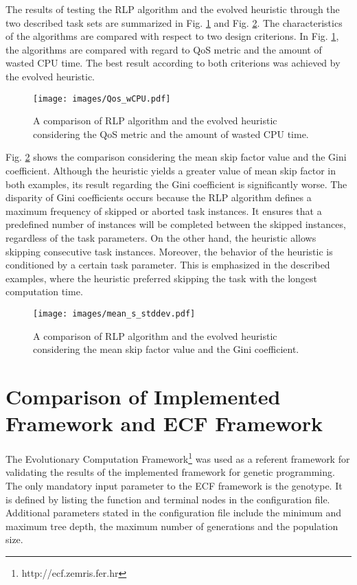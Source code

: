 The results of testing the RLP algorithm and the evolved heuristic through the two described task sets are summarized in Fig. \ref{cmp1} and Fig. \ref{cmp2}.
The characteristics of the algorithms are compared with respect to two design criterions. 
In Fig. \ref{cmp1}, the algorithms are compared with regard to QoS metric and the amount of wasted CPU time. The best result according to both criterions was achieved by the evolved heuristic. 
\begin{figure}[H]
    \centering
    \texttt{[image: images/Qos\_wCPU.pdf]}
    \caption{A comparison of RLP algorithm and the evolved heuristic considering the QoS metric and the amount of wasted CPU time.}
    \label{cmp1}
\end{figure}

Fig. \ref{cmp2} shows the comparison considering the mean skip factor value and the Gini coefficient. 
Although the heuristic yields a greater value of mean skip factor in both examples, its result regarding the Gini coefficient is significantly worse.
The disparity of Gini coefficients occurs because the RLP algorithm defines a maximum frequency of skipped or aborted task instances.
It ensures that a predefined number of instances will be completed between the skipped instances, regardless of the task parameters.
On the other hand, the heuristic allows skipping consecutive task instances.
Moreover, the behavior of the heuristic is conditioned by a certain task parameter.
This is emphasized in the described examples, where the heuristic preferred skipping the task with the longest computation time.
\begin{figure}[H]
    \centering
    \texttt{[image: images/mean\_s\_stddev.pdf]}
    \caption{A comparison of RLP algorithm and the evolved heuristic considering the mean skip factor value and the Gini coefficient.}
    \label{cmp2}
\end{figure}

\section{Comparison of Implemented Framework and ECF Framework}
The Evolutionary Computation Framework\footnote{http://ecf.zemris.fer.hr} was used as a referent framework for validating the results of the implemented framework for genetic programming.
The only mandatory input parameter to the ECF framework is the genotype.
It is defined by listing the function and terminal nodes in the configuration file.
Additional parameters stated in the configuration file include the minimum and maximum tree depth, the maximum number of generations and the population size.

